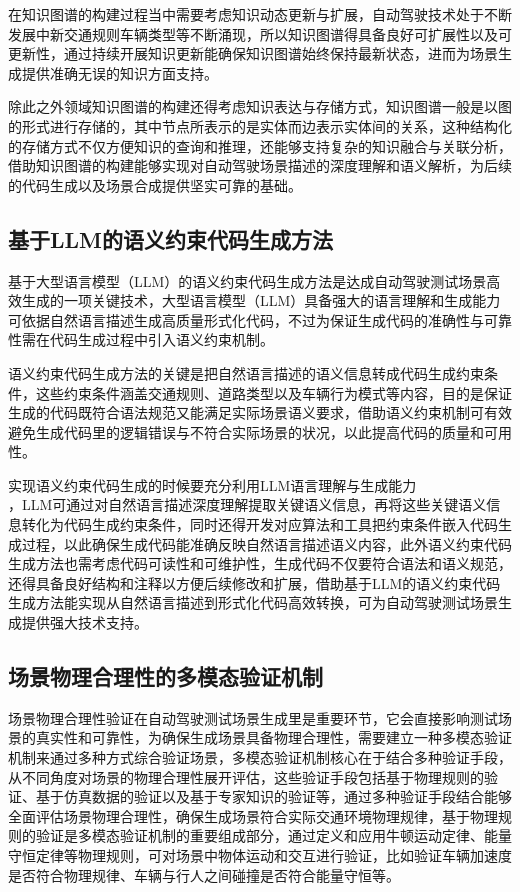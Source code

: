 在知识图谱的构建过程当中需要考虑知识动态更新与扩展\cite{Yang2020SurfelGAN}，自动驾驶技术处于不断发展中新交通规则车辆类型等不断涌现，所以知识图谱得具备良好可扩展性以及可更新性，通过持续开展知识更新能确保知识图谱始终保持最新状态，进而为场景生成提供准确无误的知识方面支持。
	
除此之外领域知识图谱的构建还得考虑知识表达与存储方式，知识图谱一般是以图的形式进行存储的\cite{Yao2022React}，其中节点所表示的是实体而边表示实体间的关系，这种结构化的存储方式不仅方便知识的查询和推理，还能够支持复杂的知识融合与关联分析，借助知识图谱的构建能够实现对自动驾驶场景描述的深度理解和语义解析，为后续的代码生成以及场景合成提供坚实可靠的基础。
	
	\subsection{基于LLM的语义约束代码生成方法}
基于大型语言模型（LLM）的语义约束代码生成方法是达成自动驾驶测试场景高效生成的一项关键技术，大型语言模型（LLM）具备强大的语言理解和生成能力可依据自然语言描述生成高质量形式化代码，不过为保证生成代码的准确性与可靠性需在代码生成过程中引入语义约束机制\cite{Zhang2023CAT}。
	
语义约束代码生成方法的关键是把自然语言描述的语义信息转成代码生成约束条件，这些约束条件涵盖交通规则、道路类型以及车辆行为模式等内容，目的是保证生成的代码既符合语法规范又能满足实际场景语义要求\cite{Zhang2022AdversarialRobustness}，借助语义约束机制可有效避免生成代码里的逻辑错误与不符合实际场景的状况，以此提高代码的质量和可用性。
	
实现语义约束代码生成的时候要充分利用LLM语言理解与生成能力\\ \cite{Zheng2023JudgingLLM}，LLM可通过对自然语言描述深度理解提取关键语义信息，再将这些关键语义信息转化为代码生成约束条件，同时还得开发对应算法和工具把约束条件嵌入代码生成过程，以此确保生成代码能准确反映自然语言描述语义内容，此外语义约束代码生成方法也需考虑代码可读性和可维护性，生成代码不仅要符合语法和语义规范，还得具备良好结构和注释以方便后续修改和扩展，借助基于LLM的语义约束代码生成方法能实现从自然语言描述到形式化代码高效转换\cite{zhong2023language}，可为自动驾驶测试场景生成提供强大技术支持。
	
	\subsection{场景物理合理性的多模态验证机制}
	场景物理合理性验证在自动驾驶测试场景生成里是重要环节\cite{zhao2025key}，它会直接影响测试场景的真实性和可靠性，为确保生成场景具备物理合理性，需要建立一种多模态验证机制来通过多种方式综合验证场景，多模态验证机制核心在于结合多种验证手段，从不同角度对场景的物理合理性展开评估，这些验证手段包括基于物理规则的验证、基于仿真数据的验证以及基于专家知识的验证等，通过多种验证手段结合能够全面评估场景物理合理性，确保生成场景符合实际交通环境物理规律\cite{Yao2022React}，基于物理规则的验证是多模态验证机制的重要组成部分，通过定义和应用牛顿运动定律、能量守恒定律等物理规则，可对场景中物体运动和交互进行验证，比如验证车辆加速度是否符合物理规律、车辆与行人之间碰撞是否符合能量守恒等。

